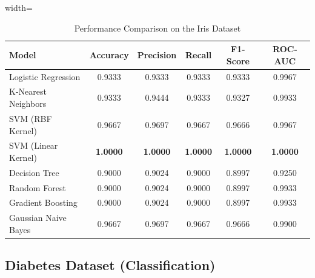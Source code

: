 \documentclass[12pt,a4paper]{article}
\begin{document}
\begin{table}[H]
\centering
\caption{Performance Comparison on the Iris Dataset}
\label{tab:iris_results}

\renewcommand{\arraystretch}{1.2}

\begin{adjustbox}{width=\textwidth}
\begin{tabular}{|l|c|c|c|c|c|}

\toprule

\textbf{Model}
&
\textbf{Accuracy}
&
\textbf{Precision}
&
\textbf{Recall}
&
\textbf{F1-Score}
&
\textbf{ROC-AUC}

\\

\midrule

Logistic Regression &
0.9333 &
0.9333 &
0.9333 &
0.9333 &
0.9967 \\

K-Nearest Neighbors &
0.9333 &
0.9444 &
0.9333 &
0.9327 &
0.9933 \\

SVM (RBF Kernel) &
0.9667 &
0.9697 &
0.9667 &
0.9666 &
0.9967 \\

SVM (Linear Kernel) &
\textbf{1.0000} &
\textbf{1.0000} &
\textbf{1.0000} &
\textbf{1.0000} &
\textbf{1.0000} \\

Decision Tree &
0.9000 &
0.9024 &
0.9000 &
0.8997 &
0.9250 \\

Random Forest &
0.9000 &
0.9024 &
0.9000 &
0.8997 &
0.9933 \\

Gradient Boosting &
0.9000 &
0.9024 &
0.9000 &
0.8997 &
0.9933 \\

Gaussian Naive Bayes &
0.9667 &
0.9697 &
0.9667 &
0.9666 &
0.9900 \\

\bottomrule

\end{tabular}
\end{adjustbox}

\end{table}

\subsection{Diabetes Dataset (Classification)}
\end{document}
